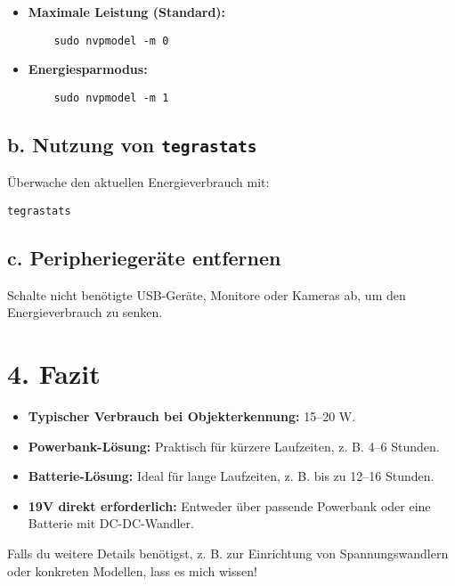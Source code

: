 \documentclass[a4paper,12pt]{article}
\begin{document}
\begin{itemize}
    \item \textbf{Maximale Leistung (Standard):}
    \begin{verbatim}
    sudo nvpmodel -m 0
    \end{verbatim}
    \item \textbf{Energiesparmodus:}
    \begin{verbatim}
    sudo nvpmodel -m 1
    \end{verbatim}
\end{itemize}

\subsection*{b. Nutzung von \texttt{tegrastats}}
Überwache den aktuellen Energieverbrauch mit:
\begin{verbatim}
tegrastats
\end{verbatim}

\subsection*{c. Peripheriegeräte entfernen}
Schalte nicht benötigte USB-Geräte, Monitore oder Kameras ab, um den Energieverbrauch zu senken.

\section*{4. Fazit}

\begin{itemize}
    \item \textbf{Typischer Verbrauch bei Objekterkennung:} 15--20 W.
    \item \textbf{Powerbank-Lösung:} Praktisch für kürzere Laufzeiten, z. B. 4--6 Stunden.
    \item \textbf{Batterie-Lösung:} Ideal für lange Laufzeiten, z. B. bis zu 12--16 Stunden.
    \item \textbf{19V direkt erforderlich:} Entweder über passende Powerbank oder eine Batterie mit DC-DC-Wandler.
\end{itemize}

Falls du weitere Details benötigst, z. B. zur Einrichtung von Spannungswandlern oder konkreten Modellen, lass es mich wissen!
\end{document}
